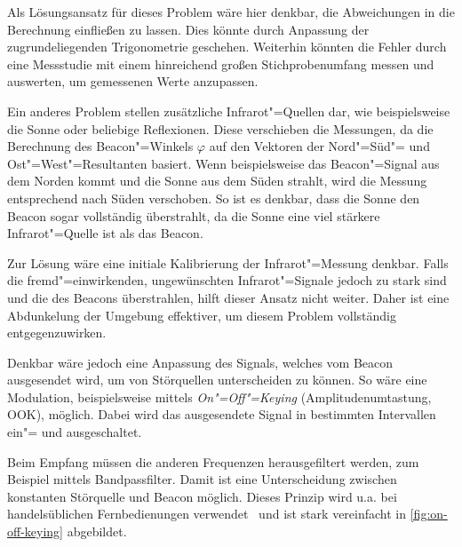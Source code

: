 Als Lösungsansatz für dieses Problem wäre hier denkbar, die Abweichungen in die Berechnung einfließen zu lassen. Dies könnte durch Anpassung der zugrundeliegenden Trigonometrie geschehen. Weiterhin könnten die Fehler durch eine Messstudie mit einem hinreichend großen Stichprobenumfang messen und auswerten, um gemessenen Werte anzupassen.


Ein anderes Problem stellen zusätzliche Infrarot"=Quellen dar, wie beispielsweise die Sonne oder beliebige Reflexionen. Diese verschieben die Messungen, da die Berechnung des Beacon"=Winkels $\varphi$ auf den Vektoren der Nord"=Süd"= und Ost"=West"=Resultanten basiert. Wenn beispielsweise das Beacon"=Signal aus dem Norden kommt und die Sonne aus dem Süden strahlt, wird die Messung entsprechend nach Süden verschoben. So ist es denkbar, dass die Sonne den Beacon sogar vollständig überstrahlt, da die Sonne eine viel stärkere Infrarot"=Quelle ist als das Beacon.

Zur Lösung wäre eine initiale Kalibrierung der Infrarot"=Messung denkbar. Falls die fremd"=einwirkenden, ungewünschten Infrarot"=Signale jedoch zu stark sind und die des Beacons überstrahlen, hilft dieser Ansatz nicht weiter. Daher ist eine Abdunkelung der Umgebung effektiver, um diesem Problem vollständig entgegenzuwirken.

Denkbar wäre jedoch eine Anpassung des Signals, welches vom Beacon ausgesendet wird, um von Störquellen unterscheiden zu können. So wäre eine Modulation, beispielsweise mittels \emph{On"=Off"=Keying} (Amplitudenumtastung, OOK), möglich. Dabei wird das ausgesendete Signal in bestimmten Intervallen ein"= und ausgeschaltet. 

Beim Empfang müssen die anderen Frequenzen herausgefiltert werden, zum Beispiel mittels Bandpassfilter. Damit ist eine Unterscheidung zwischen konstanten Störquelle und Beacon möglich. Dieses Prinzip wird u.a. bei handelsüblichen Fernbedienungen verwendet~\cite{ewaldIRFernbedienungen2019} und ist stark vereinfacht in \autoref{fig:on-off-keying} abgebildet.

